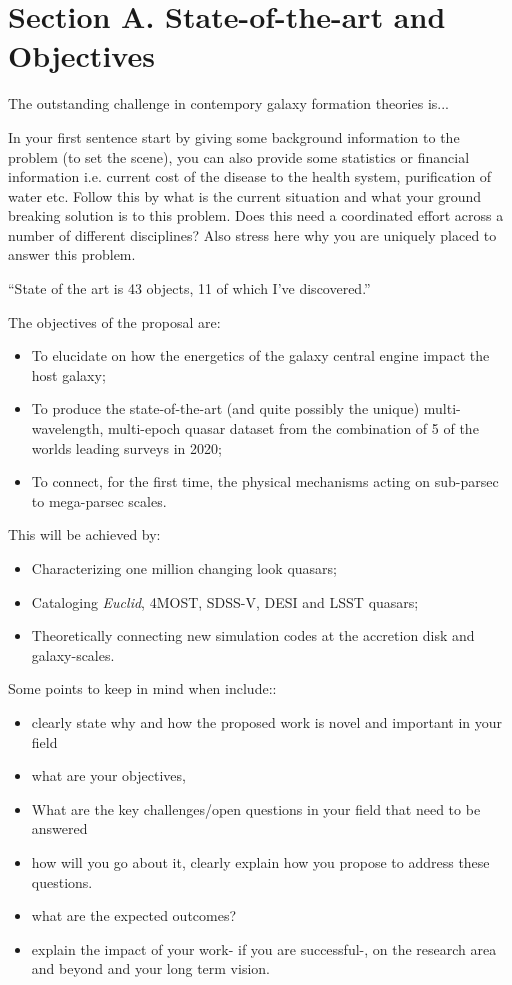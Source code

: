 \documentclass[oneside, a4paper, onecolumn, 11pt]{article}
\begin{document}
\section{Section A. State-of-the-art and Objectives}
The outstanding challenge in contempory galaxy formation theories is...

In your first sentence start by giving some background information to the problem (to set the scene), you can also provide some statistics or financial information i.e. current cost of the disease to the health system, purification of water etc. Follow this by what is the current situation and what your ground breaking solution is to this problem. Does this need a coordinated effort across a number of different disciplines? Also stress here why you are uniquely placed to answer this problem.

``State of the art is 43 objects, 11 of which I've discovered.''

The objectives of the proposal are:
\begin{itemize}
\item To elucidate on how the energetics of the galaxy central engine impact the host galaxy;
\item To produce the state-of-the-art (and quite possibly the unique) multi-wavelength, multi-epoch 
quasar dataset from the combination of 5 of the worlds leading surveys in 2020; 
\item To connect, for the first time, the physical mechanisms acting on sub-parsec to mega-parsec scales. 
\end{itemize}

This will be achieved by:
\begin{itemize}
\item Characterizing one million changing look quasars;
\item Cataloging {\it Euclid}, 4MOST, SDSS-V, DESI and LSST quasars; 
\item Theoretically connecting new simulation codes at the accretion disk and galaxy-scales. 
\end{itemize}

Some points to keep in mind when include::
\begin{itemize}
\item clearly state why and how the proposed work is novel and important in your field
\item what are your objectives,
\item What are the key challenges/open questions in your field that need to be answered 
\item how will you go about it, clearly explain how you propose to address these questions. 
\item what are the expected outcomes?
\item  explain the impact of your work- if you are successful-, on the research area and beyond and your long term vision.
\end{itemize}
\end{document}
